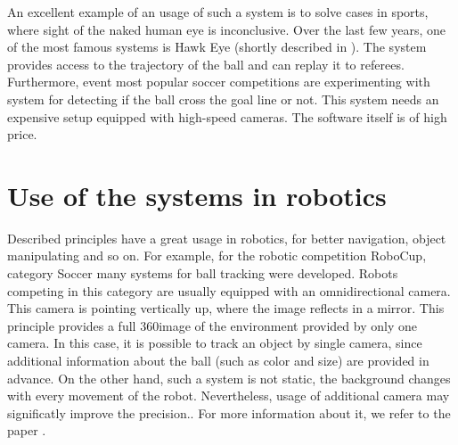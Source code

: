 An excellent example of an usage of such a system is to solve cases in sports,
where sight of the naked human eye is inconclusive. Over the last few years,
one of the most famous systems is Hawk Eye (shortly described in
\citet*{owens2003hawk}). The system provides access to the trajectory of the
ball and can replay it to referees. Furthermore, event most popular soccer
competitions are experimenting with system for detecting if the ball cross the
goal line or not.  This system needs an expensive setup equipped with
high-speed cameras. The software itself is of high price.

\section{Use of the systems in robotics}

Described principles have a great usage in robotics, for better navigation,
object manipulating and so on. For example, for the robotic competition
RoboCup, category Soccer many systems for ball tracking were developed. Robots
competing in this category are usually equipped with an omnidirectional camera.
This camera is pointing vertically up, where the image reflects in a mirror.
This principle provides a full 360\degree image of the environment provided by
only one camera. In this case, it is possible to track an object by single
camera, since additional information about the ball (such as color and size)
are provided in advance. On the other hand, such a system is not static, the
background changes with every movement of the robot. Nevertheless, usage of
additional camera may significatly improve the precision.. For more information
about it, we refer to the paper \citet*{kappeler20103d}. 
